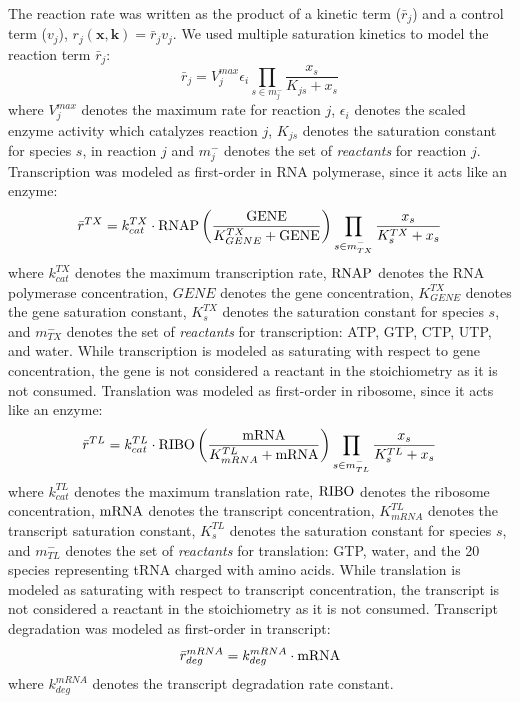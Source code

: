 \documentclass[12pt]{article}
\begin{document}
The reaction rate was written as the product of a kinetic term ($\bar{r}_{j}$) and a control term ($v_{j}$), $r_{j}\left(\mathbf{x},\mathbf{k}\right)=\bar{r}_{j}v_{j}$.
We used multiple saturation kinetics to model the reaction term $\bar{r}_{j}$:
\begin{equation}\label{eqn:rate-bar}
	\bar{r}_{j}=V_{j}^{max}\epsilon_{i}\prod_{s\in{m_{j}^{-}}}\frac{x_{s}}{K_{js} + x_{s}}
\end{equation}
where $V_{j}^{max}$ denotes the maximum rate for reaction $j$, $\epsilon_{i}$ denotes the scaled enzyme activity which catalyzes reaction $j$, $K_{js}$ denotes the saturation constant for species $s$, in reaction $j$ and $m_{j}^{-}$ denotes the set of \textit{reactants} for reaction $j$.
Transcription was modeled as first-order in RNA polymerase, since it acts like an enzyme:
\begin{equation}\label{eqn:transcription}
    \bar{r}^{TX} = k_{cat}^{TX}\cdot{\rm RNAP}\left(\frac{{\rm GENE}}{K_{GENE}^{TX}+{\rm GENE}}\right)\prod_{s\in{m_{TX}^{-}}}\frac{x_{s}}{K_{s}^{TX}+x_{s}}
\end{equation}
where $k_{cat}^{TX}$ denotes the maximum transcription rate, ${\rm RNAP}$ denotes the RNA polymerase concentration, $GENE$ denotes the gene concentration, $K_{GENE}^{TX}$ denotes the gene saturation constant, $K_{s}^{TX}$ denotes the saturation constant for species $s$, and $m_{TX}^{-}$ denotes the set of \textit{reactants} for transcription: ATP, GTP, CTP, UTP, and water.
While transcription is modeled as saturating with respect to gene concentration, the gene is not considered a reactant in the stoichiometry as it is not consumed.
Translation was modeled as first-order in ribosome, since it acts like an enzyme:
\begin{equation}\label{eqn:translation}
    \bar{r}^{TL} = k_{cat}^{TL}\cdot{\rm RIBO}\left(\frac{{\rm mRNA}}{K_{mRNA}^{TL}+{\rm mRNA}}\right)\prod_{s\in{m_{TL}^{-}}}\frac{x_{s}}{K_{s}^{TL}+x_{s}}
\end{equation}
where $k_{cat}^{TL}$ denotes the maximum translation rate, ${\rm RIBO}$ denotes the ribosome concentration, ${\rm mRNA}$ denotes the transcript concentration, $K_{mRNA}^{TL}$ denotes the transcript saturation constant, $K_{s}^{TL}$ denotes the saturation constant for species $s$, and $m_{TL}^{-}$ denotes the set of \textit{reactants} for translation: GTP, water, and the 20 species representing tRNA charged with amino acids.
While translation is modeled as saturating with respect to transcript concentration, the transcript is not considered a reactant in the stoichiometry as it is not consumed.
Transcript degradation was modeled as first-order in transcript:
\begin{equation}\label{eqn:mRNA_degradation}
    \bar{r}_{deg}^{mRNA} = k_{deg}^{mRNA}\cdot{\rm mRNA}
\end{equation}
where $k_{deg}^{mRNA}$ denotes the transcript degradation rate constant.
\end{document}
